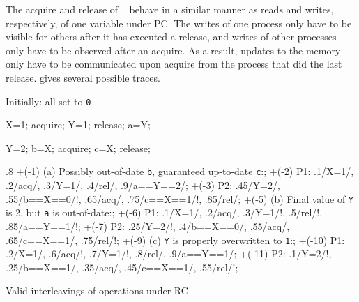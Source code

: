 The acquire and release of ~\cite{gharachorloo:release_consistency} behave in a similar manner as reads and writes, respectively, of one variable under \ac{PC}.
The writes of one process only have to be visible for others after it has executed a release, and writes of other processes only have to be observed after an acquire.
As a result, updates to the memory only have to be communicated upon acquire from the process that did the last release.
 gives several possible traces.

\begin{parcodes}%
\begin{parcol}{.15\linewidth}
Initially: all set to \lstinline|0|
\begin{parcode}{\linewidth}%
\begin{lstcode}[variable={X,Y,a}]
X=1;
acquire;
Y=1;
release;
a=Y;
\end{lstcode}%
\end{parcode}%
\begin{parcode}{\linewidth}%
\begin{lstcode}[variable={X,Y,b,c}]
Y=2;
b=X;
acquire;
c=X;
release;
\end{lstcode}%
\end{parcode}%
\end{parcol}\hfill%
\begin{parfig}{.8\linewidth}
	\memlabel	+(-1)		{(a) Possibly out-of-date \lstinline|b|, guaranteed up-to-date \lstinline|c|:};
	\memops		+(-2)		{P1}: {.1/X=1/, .2/acq/, .3/Y=1/, .4/rel/, .9/a==Y==2/};
	\memops		+(-3)		{P2}: {.45/Y=2/, .55/b==X==0/!, .65/acq/, .75/c==X==1/!, .85/rel/};
	\memlabel	+(-5)		{(b) Final value of \lstinline|Y| is 2, but \lstinline|a| is out-of-date:};
	\memops		+(-6)		{P1}: {.1/X=1/, .2/acq/, .3/Y=1/!, .5/rel/!, .85/a==Y==1/!};
	\memops		+(-7)		{P2}: {.25/Y=2/!, .4/b==X==0/, .55/acq/, .65/c==X==1/, .75/rel/!};
	\memlabel	+(-9)		{(c) \lstinline|Y| is properly overwritten to \lstinline|1|:};
	\memops		+(-10)		{P1}: {.2/X=1/, .6/acq/!, .7/Y=1/!, .8/rel/, .9/a==Y==1/};
	\memops		+(-11)		{P2}: {.1/Y=2/!, .25/b==X==1/, .35/acq/, .45/c==X==1/, .55/rel/!};
\end{parfig}%
\caption{Valid interleavings of operations under \acl{RC}}%
\label{fig:memory:interleavings:release}%
\end{parcodes}


